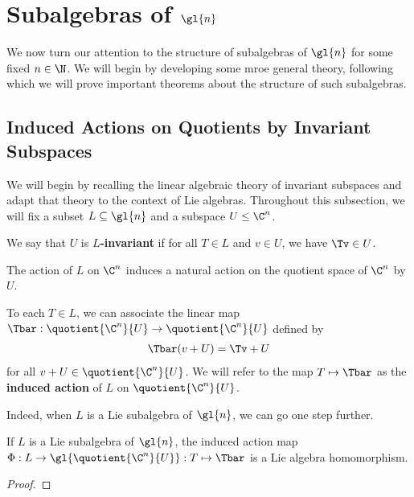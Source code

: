 \section{Subalgebras of $\gl{n}$}

We now turn our attention to the structure of subalgebras of $\gl{n}$ for some fixed $n \in \N$. We will begin by developing some mroe general theory, following which we will prove important theorems about the structure of such subalgebras.

\subsection{Induced Actions on Quotients by Invariant Subspaces}
\label{Ch1:Subsec:QuotientByInvariantSubspaces}

We will begin by recalling the linear algebraic theory of invariant subspaces and adapt that theory to the context of Lie algebras. Throughout this subsection, we will fix a subset $L \subseteq \gl{n}$ and a subspace $U \leq \C^n$.

\begin{definition}[Invariance]
    We say that $U$ is \textbf{$L$-invariant} if for all $T \in L$ and $v \in U$, we have $\Tv \in U$.
\end{definition}

The action of $L$ on $\C^n$ induces a natural action on the quotient space of $\C^n$ by $U$.

\begin{definition}
    To each $T \in L$, we can associate the linear map $\Tbar : \quotient{\C^n}{U} \to \quotient{\C^n}{U}$ defined by
    \begin{align}
        \Tbar(v + U) = \Tv + U
    \end{align}
    for all $v + U \in \quotient{\C^n}{U}$. We will refer to the map $T \mapsto \Tbar$ as the \textbf{induced action} of $L$ on $\quotient{\C^n}{U}$.
\end{definition}

Indeed, when $L$ is a Lie subalgebra of $\gl{n}$, we can go one step further.

\begin{boxproposition}\label{Ch1:Prop:InducedActionLieAlg}
    If $L$ is a Lie subalgebra of $\gl{n}$, the induced action map $\Phi : L \to \gl{\quotient{\C^n}{U}} : T \mapsto \Tbar$ is a Lie algebra homomorphism.
\end{boxproposition}
\begin{proof}
    \sorry
\end{proof}


